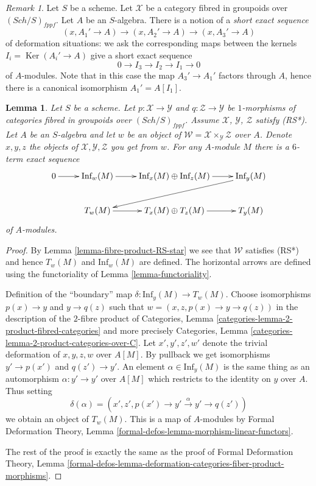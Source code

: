 \documentclass{stacks-project}
\theoremstyle{plain}
\newtheorem{lemma}[subsection]{Lemma}
\theoremstyle{definition}
\theoremstyle{remark}
\newtheorem{remark}[subsection]{Remark}
\numberwithin{equation}{subsection}
\def\Sch{\mathit{Sch}}
\def\Ker{\mathop{\mathrm{Ker}}}
\begin{document}
\begin{remark}
\label{remark-short-exact-sequence-thickenings}
Let $S$ be a scheme. Let $\mathcal{X}$ be a category
fibred in groupoids over $(\Sch/S)_{fppf}$. Let $A$ be an $S$-algebra. There
is a notion of a {\it short exact sequence}
$$
(x, A_1' \to A) \to (x, A_2' \to A) \to (x, A_3' \to A)
$$
of deformation situations: we ask the corresponding maps between
the kernels $I_i = \Ker(A_i' \to A)$ give a short exact sequence
$$
0 \to I_3 \to I_2 \to I_1 \to 0
$$
of $A$-modules. Note that in this case the map $A_3' \to A_1'$
factors through $A$, hence there is a canonical isomorphism
$A_1' = A[I_1]$.
\end{remark}

\begin{lemma}
\label{lemma-ses-inf-and-T}
Let $S$ be a scheme. Let $p : \mathcal{X} \to \mathcal{Y}$
and $q : \mathcal{Z} \to \mathcal{Y}$ be $1$-morphisms of categories
fibred in groupoids over $(\Sch/S)_{fppf}$. Assume $\mathcal{X}$,
$\mathcal{Y}$, $\mathcal{Z}$ satisfy (RS*).
Let $A$ be an $S$-algebra and let $w$ be an object of
$\mathcal{W} = \mathcal{X} \times_\mathcal{Y} \mathcal{Z}$ over $A$.
Denote $x, y, z$ the objects of $\mathcal{X}, \mathcal{Y}, \mathcal{Z}$
you get from $w$. For any $A$-module $M$ there is a $6$-term exact sequence
$$
\xymatrix{
0 \ar[r] &
\text{Inf}_w(M) \ar[r] &
\text{Inf}_x(M) \oplus \text{Inf}_z(M) \ar[r] &
\text{Inf}_y(M) \ar[lld] \\
 &
T_w(M) \ar[r] &
T_x(M) \oplus T_z(M) \ar[r] &
T_y(M)
}
$$
of $A$-modules.
\end{lemma}

\begin{proof}
By Lemma \ref{lemma-fibre-product-RS-star} we see that $\mathcal{W}$
satisfies (RS*) and hence $T_w(M)$ and $\text{Inf}_w(M)$ are defined.
The horizontal arrows are defined using the functoriality of
Lemma \ref{lemma-functoriality}.

\medskip\noindent
Definition of the ``boundary'' map $\delta : \text{Inf}_y(M) \to T_w(M)$.
Choose isomorphisms $p(x) \to y$ and $y \to q(z)$ such that
$w = (x, z, p(x) \to y \to q(z))$ in the description of
the $2$-fibre product of
Categories, Lemma \ref{categories-lemma-2-product-fibred-categories}
and more precisely
Categories, Lemma \ref{categories-lemma-2-product-categories-over-C}.
Let $x', y', z', w'$ denote the trivial deformation of
$x, y, z, w$ over $A[M]$. By pullback we get isomorphisms
$y' \to p(x')$ and $q(z') \to y'$. An element $\alpha \in \text{Inf}_y(M)$
is the same thing as an automorphism $\alpha : y' \to y'$
over $A[M]$ which restricts to the identity on $y$ over $A$.
Thus setting
$$
\delta(\alpha) =
(x', z', p(x') \to y' \xrightarrow{\alpha} y' \to q(z'))
$$
we obtain an object of $T_w(M)$. This is a map of $A$-modules
by Formal Deformation Theory, Lemma
\ref{formal-defos-lemma-morphism-linear-functors}.

\medskip\noindent
The rest of the proof is exactly the same as the proof of
Formal Deformation Theory, Lemma
\ref{formal-defos-lemma-deformation-categories-fiber-product-morphisms}.
\end{proof}
\end{document}
